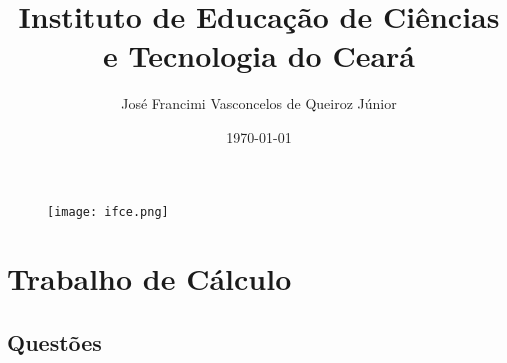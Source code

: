 \documentclass[a4paper]{exam}
\begin{document}
\begin{figure}
\centering
\texttt{[image: ifce.png]}
\end{figure}

\title{Instituto de Educação de Ciências e Tecnologia do Ceará}
\author{José Francimi Vasconcelos de Queiroz Júnior}
\date{\today}



\maketitle

\section{Trabalho de Cálculo}
\subsection{Questões}
\end{document}
